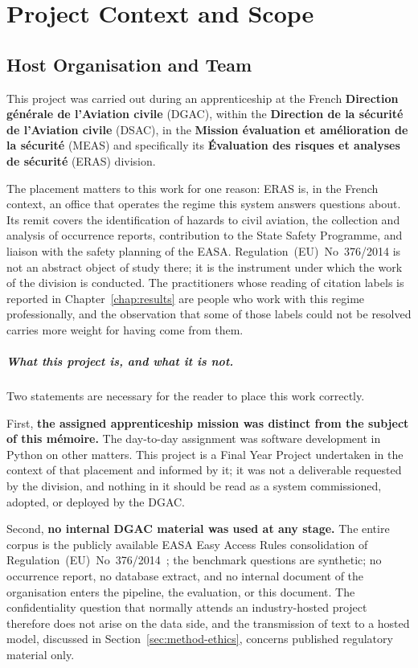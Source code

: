 \chapter{Project Context and Scope}
\label{chap:context}

\section{Host Organisation and Team}
\label{sec:context-org}

This project was carried out during an apprenticeship at the French
\textbf{Direction g\'{e}n\'{e}rale de l'Aviation civile} (DGAC), within the
\textbf{Direction de la s\'{e}curit\'{e} de l'Aviation civile} (DSAC), in the
\textbf{Mission \'{e}valuation et am\'{e}lioration de la s\'{e}curit\'{e}}
(MEAS) and specifically its \textbf{\'{E}valuation des risques et analyses de
s\'{e}curit\'{e}} (ERAS) division.

The placement matters to this work for one reason: ERAS is, in the French
context, an office that operates the regime this system answers questions about.
Its remit covers the identification of hazards to civil aviation, the collection
and analysis of occurrence reports, contribution to the State Safety Programme,
and liaison with the safety planning of the \ac{EASA}. Regulation~(EU)~No~376/2014
is not an abstract object of study there; it is the instrument under which the
work of the division is conducted. The practitioners whose reading of citation
labels is reported in Chapter~\ref{chap:results} are people who work with this
regime professionally, and the observation that some of those labels could not be
resolved carries more weight for having come from them.

\paragraph{What this project is, and what it is not.}
Two statements are necessary for the reader to place this work correctly.

First, \textbf{the assigned apprenticeship mission was distinct from the subject
of this m\'{e}moire.} The day-to-day assignment was software development in
Python on other matters. This project is a Final Year Project undertaken in the
context of that placement and informed by it; it was not a deliverable requested
by the division, and nothing in it should be read as a system commissioned,
adopted, or deployed by the DGAC.

Second, \textbf{no internal DGAC material was used at any stage.} The entire
corpus is the publicly available \ac{EASA} Easy Access Rules consolidation of
Regulation~(EU)~No~376/2014~\cite{easa2022easyaccess376}; the benchmark questions
are synthetic; no occurrence report, no database extract, and no internal
document of the organisation enters the pipeline, the evaluation, or this
document. The confidentiality question that normally attends an
industry-hosted project therefore does not arise on the data side, and the
transmission of text to a hosted model, discussed in
Section~\ref{sec:method-ethics}, concerns published regulatory material only.

